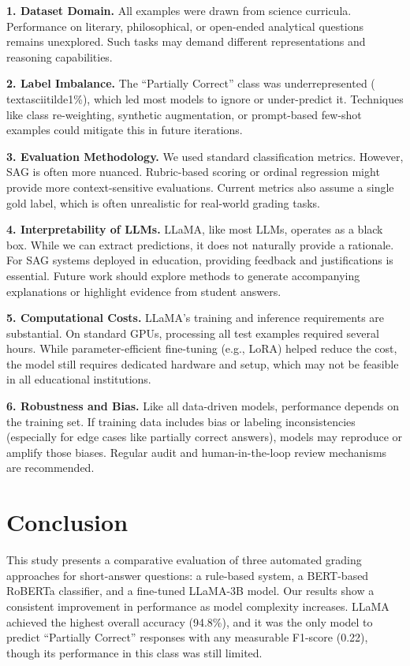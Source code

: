 \documentclass[11pt]{article}
\begin{document}
\textbf{1. Dataset Domain.} All examples were drawn from science curricula. Performance on literary, philosophical, or open-ended analytical questions remains unexplored. Such tasks may demand different representations and reasoning capabilities.

\textbf{2. Label Imbalance.} The “Partially Correct” class was underrepresented (\\textasciitilde1\%), which led most models to ignore or under-predict it. Techniques like class re-weighting, synthetic augmentation, or prompt-based few-shot examples could mitigate this in future iterations.

\textbf{3. Evaluation Methodology.} We used standard classification metrics. However, SAG is often more nuanced. Rubric-based scoring or ordinal regression might provide more context-sensitive evaluations. Current metrics also assume a single gold label, which is often unrealistic for real-world grading tasks.

\textbf{4. Interpretability of LLMs.} LLaMA, like most LLMs, operates as a black box. While we can extract predictions, it does not naturally provide a rationale. For SAG systems deployed in education, providing feedback and justifications is essential. Future work should explore methods to generate accompanying explanations or highlight evidence from student answers.

\textbf{5. Computational Costs.} LLaMA’s training and inference requirements are substantial. On standard GPUs, processing all test examples required several hours. While parameter-efficient fine-tuning (e.g., LoRA) helped reduce the cost, the model still requires dedicated hardware and setup, which may not be feasible in all educational institutions.

\textbf{6. Robustness and Bias.} Like all data-driven models, performance depends on the training set. If training data includes bias or labeling inconsistencies (especially for edge cases like partially correct answers), models may reproduce or amplify those biases. Regular audit and human-in-the-loop review mechanisms are recommended.

\section{Conclusion}
This study presents a comparative evaluation of three automated grading approaches for short-answer questions: a rule-based system, a BERT-based RoBERTa classifier, and a fine-tuned LLaMA-3B model. Our results show a consistent improvement in performance as model complexity increases. LLaMA achieved the highest overall accuracy (94.8\%), and it was the only model to predict “Partially Correct” responses with any measurable F1-score (0.22), though its performance in this class was still limited.
\end{document}
